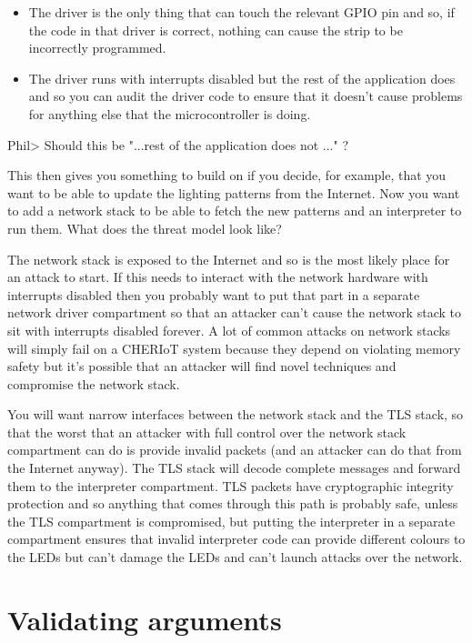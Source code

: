 \begin{itemize}
	\item{The driver is the only thing that can touch the relevant GPIO pin and so, if the code in that driver is correct, nothing can cause the strip to be incorrectly programmed.}
	\item{The driver runs with interrupts disabled but the rest of the application does and so you can audit the driver code to ensure that it doesn't cause problems for anything else that the microcontroller is doing.}
\end{itemize}
Phil> Should this be "...rest of the application does not ..." ?

This then gives you something to build on if you decide, for example, that you want to be able to update the lighting patterns from the Internet.
Now you want to add a network stack to be able to fetch the new patterns and an interpreter to run them.
What does the threat model look like?

The network stack is exposed to the Internet and so is the most likely place for an attack to start.
If this needs to interact with the network hardware with interrupts disabled then you probably want to put that part in a separate network driver compartment so that an attacker can't cause the network stack to sit with interrupts disabled forever.
A lot of common attacks on network stacks will simply fail on a CHERIoT system because they depend on violating memory safety but it's possible that an attacker will find novel techniques and compromise the network stack.

You will want narrow interfaces between the network stack and the TLS stack, so that the worst that an attacker with full control over the network stack compartment can do is provide invalid packets (and an attacker can do that from the Internet anyway).
The TLS stack will decode complete messages and forward them to the interpreter compartment.
TLS packets have cryptographic integrity protection and so anything that comes through this path is probably safe, unless the TLS compartment is compromised, but putting the interpreter in a separate compartment ensures that invalid interpreter code can provide different colours to the LEDs but can't damage the LEDs and can't launch attacks over the network.

\section{Validating arguments}

